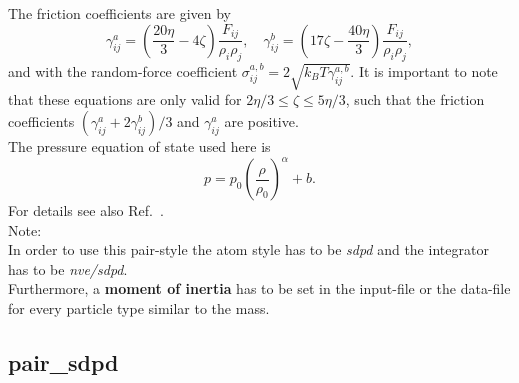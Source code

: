 \documentclass[a4paper,10pt]{scrreprt}
\begin{document}
The friction coefficients are given by
%
\begin{equation} 
	\gamma_{ij}^a = \left( \frac{20\eta}{3}-4\zeta \right)\frac{F_{ij}}{\rho_i\rho_j}, \quad \gamma_{ij}^b = \left( 17\zeta - \frac{40\eta}{3} \right)\frac{F_{ij}}{\rho_i\rho_j},
\end{equation}
% 
and with the random-force coefficient $\sigma_{ij}^{a,b} = 2\sqrt{k_BT\gamma_{ij}^{a,b}}$.
It is important to note that these equations are only valid for $2\eta/3 \le \zeta \le 5\eta /3$, such that the friction coefficients $(\gamma_{ij}^a + 2\gamma_{ij}^b)/3$ and  $\gamma_{ij}^a$ are positive.\\
%
The pressure equation of state used here is
\begin{equation}\label{eq:pressure}
p = p_0 \left( \frac{\rho}{\rho_0} \right)^{\alpha} + b.
\end{equation}
For details see also Ref.~\cite{Mueller_SDPD_2015}.\\[2ex]
Note:\\
In order to use this pair-style the atom style has to be \textit{sdpd} and the integrator has to be \textit{nve/sdpd}.\\
Furthermore, a \textbf{moment of inertia} has to be set in the input-file or the data-file for every particle type similar to the mass.


\subsection{pair\_sdpd}\label{sec:pair/sdpd}
\end{document}
